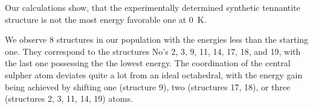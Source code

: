 \documentclass[preprint,review,12pt]{elsarticle}
\begin{document}
Our calculations show, that the experimentally determined synthetic tennantite structure is not the most energy favorable one at 0~K.

We observe 8 structures in our population with the energies less than the starting one.
They correspond to the structures No's 2, 3, 9, 11, 14, 17, 18, and 19, with the last one  possessing the the lowest energy.
The coordination of the central sulpher atom deviates quite a lot from an ideal octahedral, with the energy gain being achieved by shifting one (structure 9), two (structures 17, 18), or three (structures 2, 3, 11, 14, 19) atoms.

%

\begin{table}
\caption{\label{tab:energy}%
The difference between the reference structure energy, and the unit cell energy of tennantite with different Laves \textcolor{red}{polyhedra}.
}
\centering
{}
\end{table}
\end{document}
